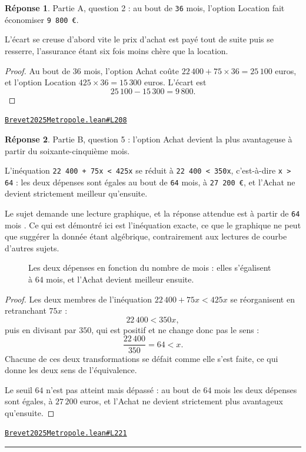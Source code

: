 \documentclass[11pt,a4paper]{article}
\theoremstyle{definition}
\theoremstyle{plain}
\theoremstyle{definition}
\newtheorem*{reponse}{Réponse}
\newcommand{\source}[2]{\par\smallskip\noindent\hfill{\footnotesize\href{#1}{\texttt{#2}}}\par\smallskip}
\begin{document}
\begin{reponse}
Partie A, question 2 : au bout de \texttt{36} mois, l'option Location fait économiser
\texttt{9 800 €}.

L'écart se creuse d'abord vite \textemdash{} le prix d'achat est payé tout de suite \textemdash{} puis se
resserre, l'assurance étant six fois moins chère que la location.
\end{reponse}
\begin{proof}
Au bout de $36$ mois, l'option Achat coûte $22\,400 + 75 \times 36 = 25\,100$ euros, et
l'option Location $425 \times 36 = 15\,300$ euros. L'écart est
\[ 25\,100 - 15\,300 = 9\,800 . \]
\end{proof}
\source{https://github.com/Commutator-IO/learn-lean/blob/main/exams/2025/Brevet2025Metropole.lean\#L208}{Brevet2025Metropole.lean\#L208}

\begin{reponse}
Partie B, question 5 : l'option Achat devient la plus avantageuse à partir du
soixante-cinquième mois.

L'inéquation \texttt{22 400 + 75x < 425x} se réduit à \texttt{22 400 < 350x}, c'est-à-dire
\texttt{x > 64} : les deux dépenses sont égales au bout de \texttt{64} mois, à \texttt{27 200 €}, et
l'Achat ne devient strictement meilleur qu'ensuite.

Le sujet demande une lecture graphique, et la réponse attendue est \og{} à partir de
\texttt{64} mois \fg{}. Ce qui est démontré ici est l'inéquation exacte, ce que le graphique ne
peut que suggérer \textemdash{} la donnée étant algébrique, contrairement aux lectures de courbe
d'autres sujets.
\end{reponse}

\begin{figure}[h]
\centering

\caption{Les deux dépenses en fonction du nombre de mois : elles s'égalisent à \(64\) mois, et l'Achat devient meilleur ensuite.}
\end{figure}
\begin{proof}
Les deux membres de l'inéquation $22\,400 + 75x < 425x$ se réorganisent en retranchant
$75x$ :
\[ 22\,400 < 350x , \]
puis en divisant par $350$, qui est positif et ne change donc pas le sens :
\[ \frac{22\,400}{350} = 64 < x . \]
Chacune de ces deux transformations se défait comme elle s'est faite, ce qui donne les
deux sens de l'équivalence.

Le seuil $64$ n'est pas atteint mais dépassé : au bout de $64$ mois les deux dépenses sont
égales, à $27\,200$ euros, et l'Achat ne devient strictement plus avantageux qu'ensuite.
\end{proof}
\source{https://github.com/Commutator-IO/learn-lean/blob/main/exams/2025/Brevet2025Metropole.lean\#L221}{Brevet2025Metropole.lean\#L221}

\vfill
\noindent\rule{0.35\linewidth}{0.4pt}\par
{}
\end{document}
